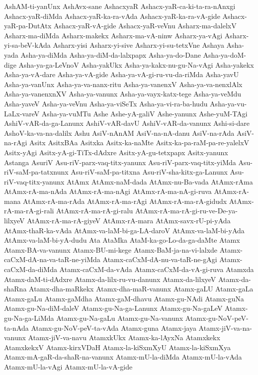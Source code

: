 {AshAM-ti-yanUnx
AshAvx-sane
AshacxyaR
Ashacx-yaR-ca-ki-ta-ra-nAnxgi
Ashacx-yaR-diMda
Ashacx-yaR-ka-ra-vAda
Ashacx-yaR-ka-ra-vA-gide
Ashacx-yaR-pa-DutAtx
Ashacx-yaR-vA-gide
Ashacx-yaR-veVnu
Asharx-ma-dalelxV
Asharx-ma-diMda
Asharx-makekx
Asharx-ma-vA-ninw
Asharx-ya-vAgi
Asharx-yi-sa-beV-kAda
Asharx-yisi
Asharx-yi-sive
Asharx-yi-su-tetxVne
Ashaya
Asha-yada
Asha-ya-diMda
Asha-ya-diM-da-lalxpapx
Asha-ya-do-Dane
Asha-ya-doM-dige
Asha-ya-ga-LeVnoV
Asha-yakUkx
Asha-ya-kakx-nu-gu-Na-vAgi
Asha-yakekx
Asha-ya-vA-dare
Asha-ya-vA-gide
Asha-ya-vA-gi-ru-vu-da-riMda
Asha-yavU
Asha-ya-vanUnx
Asha-ya-va-nanx-ritu
Asha-ya-vanenxV
Asha-ya-va-nenxlAlx
Asha-ya-vanenxnXV
Asha-ya-vanunx
Asha-ya-vayx-katx-tege
Asha-ya-veMdu
Asha-yaveV
Asha-ya-veVnu
Asha-ya-viSeTx
Asha-ya-vi-ra-ba-hudu
Asha-ya-vu-LaLx-vareV
Asha-ya-vuMTu
Ashe
Ashe-yA-galiV
Ashe-yanunx
Ashe-yuM-TAgi
AshiV-vAR-da-ga-Lanunx
AshiV-vAR-davU
AshiV-vAR-da-vanunx
Ashi-si-dare
AshoV-ka-va-na-dalilx
Ashu
AsiV-nAnAM
AsiV-na-nA-danu
AsiV-na-rAda
AsiV-na-rAgi
Asitx
AsitxBAa
Asitxka
Asitx-ka-naMte
Asitx-ka-pa-raM-pa-re-yalelxV
Asitx-yAgi
Asitx-yA-gi-TiTx-dAdxre
Asitx-yA-gu-tetxpapx
Asitx-yanunx
Astanga
AsuriV
Asu-riV-parx-vaq-titx-yanunx
Asu-riV-parx-vaq-titx-yiMda
Asu-riV-saM-pa-tatxnunx
Asu-riV-saM-pa-titxna
Asu-riV-sha-kitx-ga-Lanunx
Asu-riV-vaq-titx-yanunx
AtAmx
AtAmx-naM-dada
AtAmx-nu-Ba-vada
AtAmx-rAma
AtAmx-rA-ma-nAda
AtAmx-rA-ma-nAgi
AtAmx-rA-ma-nA-gi-ruva
AtAmx-rA-mana
AtAmx-rA-ma-rAda
AtAmx-rA-ma-rAgi
AtAmx-rA-ma-rA-gidudx
AtAmx-rA-ma-rA-gi-rali
AtAmx-rA-ma-rA-gi-ralu
AtAmx-rA-ma-rA-gi-ru-ve-De-ya-lilxyeV
AtAmx-rA-ma-rA-giyeV
AtAmx-rA-mara
AtAmx-savx-rU-pi-yAda
AtAmx-thaR-ka-vAda
AtAmx-va-laM-bi-ga-LA-daroV
AtAmx-va-laM-bi-yAda
AtAmx-va-laM-bi-yA-dudu
Ata
AtaMka
AtaM-ka-go-Lo-da-ga-daMte
Atamx
Atamx-BA-va-vanunx
Atamx-BU-mi-kege
Atamx-BaM-ja-na-vi-lalxde
Atamx-caCxM-dA-na-va-taR-ne-yiMda
Atamx-caCxM-dA-nu-va-taR-ne-gAgi
Atamx-caCxM-da-diMda
Atamx-caCxM-da-vAda
Atamx-caCxM-da-vA-gi-ruva
Atamxda
Atamx-daM-ti-dAdxre
Atamx-da-lilx-ru-vu-danunx
Atamx-da-lilxyeV
Atamx-da-shaRna
Atamx-dha-maRkekx
Atamx-dha-maR-vanunx
Atamx-gaLU
Atamx-gaLa
Atamx-gaLu
Atamx-gaMdha
Atamx-gaM-dhavu
Atamx-gu-NAdi
Atamx-guNa
Atamx-gu-Na-diM-daleV
Atamx-gu-Na-ga-Lanunx
Atamx-gu-Na-gaLeV
Atamx-gu-Na-ga-LiMda
Atamx-gu-Na-gaLu
Atamx-gu-Na-vanunx
Atamx-gu-NoV-peV-ta-nAda
Atamx-gu-NoV-peV-ta-vAda
Atamx-guna
Atamx-jaya
Atamx-jiV-va-na-vanunx
Atamx-jiV-va-navu
AtamxkUkx
Atamx-ka-lAyxNa
Atamxkekx
AtamxkekxV
Atamx-kirxVDaH
Atamx-la-kiSxmXyU
Atamx-la-kiSxmXya
Atamx-mA-gaR-da-shaR-na-vanunx
Atamx-mU-la-diMda
Atamx-mU-la-vAda
Atamx-mU-la-vAgi
Atamx-mU-la-vA-gide
}
